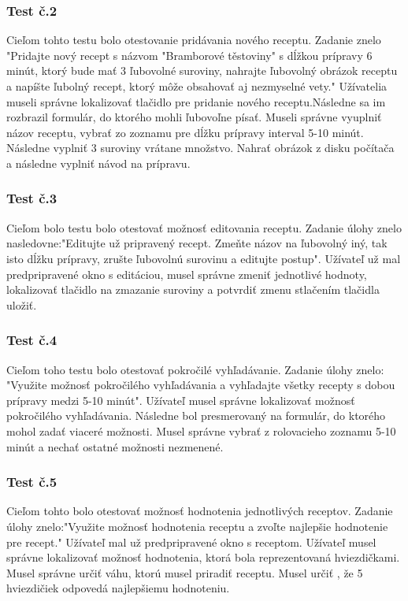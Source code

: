 \documentclass[12pt,a4paper,titlepage,final]{article}
\begin{document}
\subsubsection{Test č.2}
Cieľom tohto testu bolo otestovanie pridávania nového receptu. Zadanie znelo "Pridajte nový recept s názvom "Bramborové těstoviny" s dĺžkou prípravy 6 minút, ktorý bude mať 3 ľubovolné suroviny, nahrajte ľubovolný obrázok receptu a napíšte ľubolný recept, ktorý môže obsahovať aj nezmyselné vety." Užívatelia museli správne lokalizovať tlačidlo pre pridanie nového receptu.Následne sa im rozbrazil formulár, do ktorého mohli ľubovoľne písať. Museli správne vyuplniť názov receptu, vybrať zo zoznamu pre dĺžku prípravy interval 5-10 minút. Následne vyplniť 3 suroviny vrátane množstvo. Nahrať obrázok z disku počítača a následne vyplniť návod na prípravu.

\subsubsection{Test č.3}
Cieľom bolo testu bolo otestovať možnosť editovania receptu. Zadanie úlohy znelo nasledovne:"Editujte už pripravený recept. Zmeňte názov na ľubovolný iný, tak isto dĺžku prípravy, zrušte ľubovolnú surovinu a editujte postup". Užívateľ už mal predpripravené okno s editáciou, musel správne zmeniť jednotlivé hodnoty, lokalizovať tlačidlo na zmazanie suroviny a potvrdiť zmenu stlačením tlačidla uložiť.

\subsubsection{Test č.4}
Cieľom toho testu bolo otestovať pokročilé vyhľadávanie. Zadanie úlohy znelo: "Využite možnosť pokročilého vyhľadávania a vyhľadajte všetky recepty s dobou prípravy medzi 5-10 minút". Užívateľ musel správne lokalizovať možnosť pokročilého vyhľadávania. Následne bol presmerovaný na formulár, do ktorého mohol zadať viaceré možnosti. Musel správne vybrať z rolovacieho zoznamu 5-10 minút a nechať ostatné možnosti nezmenené.

\subsubsection{Test č.5}
Cieľom tohto bolo otestovať možnosť hodnotenia jednotlivých receptov. Zadanie úlohy znelo:"Využite možnosť hodnotenia receptu a zvoľte najlepšie hodnotenie pre recept." Užívateľ mal už predpripravené okno s receptom. Užívateľ musel správne lokalizovať možnosť hodnotenia, ktorá bola reprezentovaná hviezdičkami. Musel správne určiť váhu, ktorú musel priradiť receptu. Musel určiť , že 5 hviezdičiek odpovedá najlepšiemu hodnoteniu.
\end{document}
